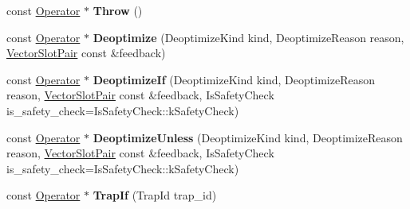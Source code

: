 \begin{DoxyCompactItemize}
\item 
\mbox{\label{classv8_1_1internal_1_1compiler_1_1CommonOperatorBuilder_ad38e9f5a6e56b85290f47eca57eac56c}} 
const \mbox{\hyperlink{classv8_1_1internal_1_1compiler_1_1Operator}{Operator}} $\ast$ {\bfseries Throw} ()
\item 
\mbox{\label{classv8_1_1internal_1_1compiler_1_1CommonOperatorBuilder_a1f0e3e4a57ad52fdbc815745082579d3}} 
const \mbox{\hyperlink{classv8_1_1internal_1_1compiler_1_1Operator}{Operator}} $\ast$ {\bfseries Deoptimize} (Deoptimize\+Kind kind, Deoptimize\+Reason reason, \mbox{\hyperlink{classv8_1_1internal_1_1VectorSlotPair}{Vector\+Slot\+Pair}} const \&feedback)
\item 
\mbox{\label{classv8_1_1internal_1_1compiler_1_1CommonOperatorBuilder_a57fe52d1486fc4d73f3600f58b77ba1e}} 
const \mbox{\hyperlink{classv8_1_1internal_1_1compiler_1_1Operator}{Operator}} $\ast$ {\bfseries Deoptimize\+If} (Deoptimize\+Kind kind, Deoptimize\+Reason reason, \mbox{\hyperlink{classv8_1_1internal_1_1VectorSlotPair}{Vector\+Slot\+Pair}} const \&feedback, Is\+Safety\+Check is\+\_\+safety\+\_\+check=Is\+Safety\+Check\+::k\+Safety\+Check)
\item 
\mbox{\label{classv8_1_1internal_1_1compiler_1_1CommonOperatorBuilder_a5aeb7692d4864a51e85b151d15b74e9b}} 
const \mbox{\hyperlink{classv8_1_1internal_1_1compiler_1_1Operator}{Operator}} $\ast$ {\bfseries Deoptimize\+Unless} (Deoptimize\+Kind kind, Deoptimize\+Reason reason, \mbox{\hyperlink{classv8_1_1internal_1_1VectorSlotPair}{Vector\+Slot\+Pair}} const \&feedback, Is\+Safety\+Check is\+\_\+safety\+\_\+check=Is\+Safety\+Check\+::k\+Safety\+Check)
\item 
\mbox{\label{classv8_1_1internal_1_1compiler_1_1CommonOperatorBuilder_a31b6ea5a89b5ccc6e50b733138388e01}} 
const \mbox{\hyperlink{classv8_1_1internal_1_1compiler_1_1Operator}{Operator}} $\ast$ {\bfseries Trap\+If} (Trap\+Id trap\+\_\+id)
\item 
\mbox{\label{classv8_1_1internal_1_1compiler_1_1CommonOperatorBuilder_ad9c060019a19b73785627962b57e1d06}} 

\end{DoxyCompactItemize}
